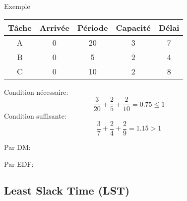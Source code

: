 \begin{frame}{Exemple}
  \begin{center}
    \begin{tabular}{ccccc}
      \hline
      Tâche & Arrivée & Période & Capacité & Délai \\
      \hline
      A & 0 & 20 & 3 & 7\\
      B & 0 &  5 & 2 & 4\\
      C & 0 & 10 & 2 & 8\\
      \hline
    \end{tabular}
  \end{center}
  \begin{overprint}

    Condition nécessaire:
    $$\frac{3}{20} + \frac{2}{5} + \frac{2}{10} = 0.75 ≤ 1$$
    Condition suffisante:
    $$\frac{3}{7} + \frac{2}{4} + \frac{2}{9} = 1.15 > 1$$

    Par DM:
    \begin{center}
      
    \end{center}

    Par EDF:
    \begin{center}
      
    \end{center}
  \end{overprint}
\end{frame} 
  
\subsection{Least Slack Time (LST)}

